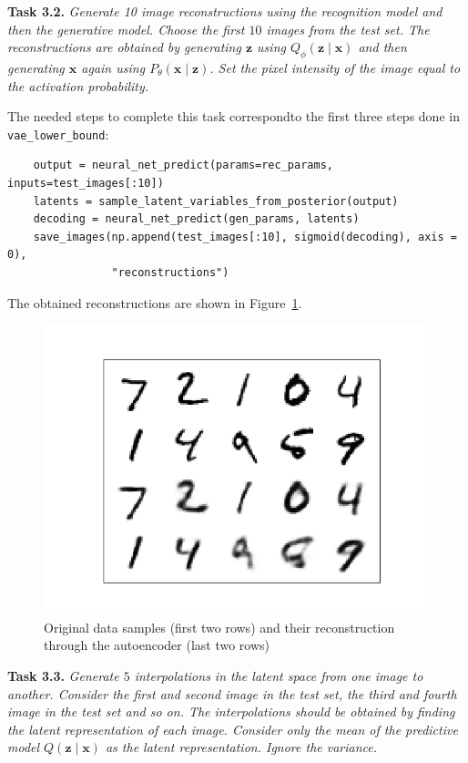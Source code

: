 \documentclass[11pt]{article}
\begin{document}
\textbf{Task 3.2.} \emph{Generate 10 image reconstructions using the recognition model and then the generative model. Choose the first \( 10 \)  images from the test set. The reconstructions are obtained by generating \( \bm{z} \)  using \( Q_{\phi}(\bm{z} \mid \bm{x}) \)  and then generating \( \bm{x} \)  again using \( P_{\theta}(\bm{x} \mid \bm{z}) \). Set the pixel intensity of the image equal to the activation probability.}

The needed steps to complete this task correspondto the first three steps done in \texttt{vae\_lower\_bound}:
\begin{verbatim}
    output = neural_net_predict(params=rec_params, inputs=test_images[:10])
    latents = sample_latent_variables_from_posterior(output)
    decoding = neural_net_predict(gen_params, latents)
    save_images(np.append(test_images[:10], sigmoid(decoding), axis = 0),
                "reconstructions")

\end{verbatim}


The obtained reconstructions are shown in Figure~\ref{img:3.2}.
\begin{figure}[H]
  \centering
  \includegraphics[scale = 0.5]{imgs/reconstructions.png}
  \caption{Original data samples (first two rows) and their reconstruction through the autoencoder (last two rows)}\label{img:3.2}
\end{figure}

\textbf{Task 3.3.} \emph{Generate \( 5 \)  interpolations in the latent space from one image to another. Consider the first and second image in the test set, the third and fourth image in the test set and so on. The interpolations should be obtained by finding the latent representation of each image. Consider only the mean of the predictive model \( Q(\bm{z} \mid \bm{x}) \)  as the latent representation. Ignore the variance.}
\end{document}
